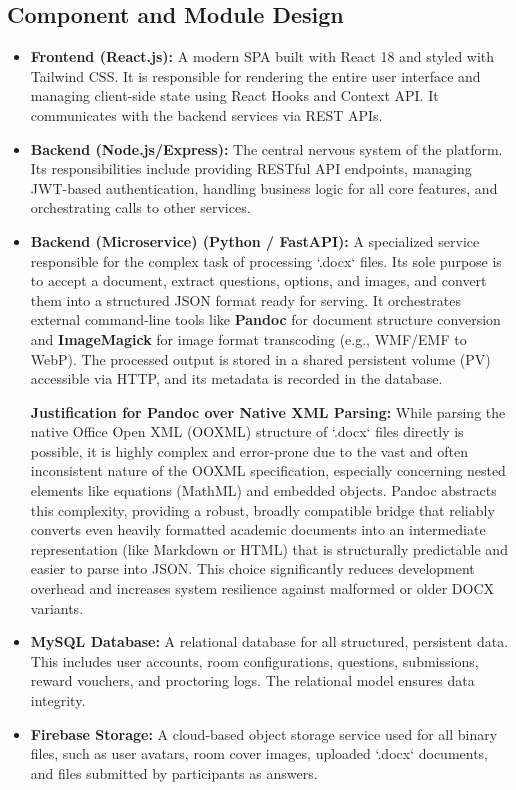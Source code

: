 \subsection{Component and Module Design}

\begin{itemize}
    \item \textbf{Frontend (React.js):} A modern SPA built with React 18 and styled with Tailwind CSS. It is responsible for rendering the entire user interface and managing client-side state using React Hooks and Context API. It communicates with the backend services via REST APIs.

    \item \textbf{Backend (Node.js/Express):} The central nervous system of the platform. Its responsibilities include providing RESTful API endpoints, managing JWT-based authentication, handling business logic for all core features, and orchestrating calls to other services.

    \item \textbf{Backend (Microservice) (Python / FastAPI):} A specialized service responsible for the complex task of processing `.docx` files. Its sole purpose is to accept a document, extract questions, options, and images, and convert them into a structured JSON format ready for serving. It orchestrates external command-line tools like \textbf{Pandoc} for document structure conversion and \textbf{ImageMagick} for image format transcoding (e.g., WMF/EMF to WebP). The processed output is stored in a shared persistent volume (PV) accessible via HTTP, and its metadata is recorded in the database.

\textbf{Justification for Pandoc over Native XML Parsing:} While parsing the native Office Open XML (OOXML) structure of `.docx` files directly is possible, it is highly complex and error-prone due to the vast and often inconsistent nature of the OOXML specification, especially concerning nested elements like equations (MathML) and embedded objects. Pandoc abstracts this complexity, providing a robust, broadly compatible bridge that reliably converts even heavily formatted academic documents into an intermediate representation (like Markdown or HTML) that is structurally predictable and easier to parse into JSON. This choice significantly reduces development overhead and increases system resilience against malformed or older DOCX variants.

    \item \textbf{MySQL Database:} A relational database for all structured, persistent data. This includes user accounts, room configurations, questions, submissions, reward vouchers, and proctoring logs. The relational model ensures data integrity.

    \item \textbf{Firebase Storage:} A cloud-based object storage service used for all binary files, such as user avatars, room cover images, uploaded `.docx` documents, and files submitted by participants as answers.
\end{itemize}


